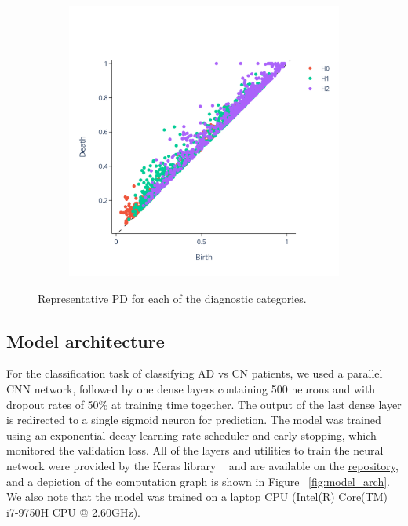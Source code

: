 \documentclass{article}
\begin{document}
\begin{figure}
\begin{subfigure}{0.3\textwidth}
  \end{subfigure}
  \begin{subfigure}{0.3\textwidth}
    \includegraphics[width=\textwidth]{figures/PDs/persistence_diagram_AD.png}
  \end{subfigure}
  \caption{Representative PD for each of the diagnostic categories.}
  \label{fig:sample_rep_pd}
\end{figure}


\subsection{Model architecture}
For the classification task of classifying AD vs CN patients, we used a parallel CNN network, followed by one dense layers containing 500 neurons and with dropout rates of 50\% at training time together. The output of the last dense layer is redirected to a single sigmoid neuron for prediction. The model was trained using an exponential decay learning rate scheduler and early stopping, which monitored the validation loss. All of the layers and utilities to train the neural network were provided by the Keras library ~\citep{chollet2015keras} and are available on the \href{https://github.com/pjhartout/TDA_ADNI_MLCB}{repository}, and a depiction of the computation graph is shown in Figure ~\ref{fig:model_arch}. We also note that the model was trained on a laptop CPU (Intel(R) Core(TM) i7-9750H CPU @ 2.60GHz).
\end{document}

